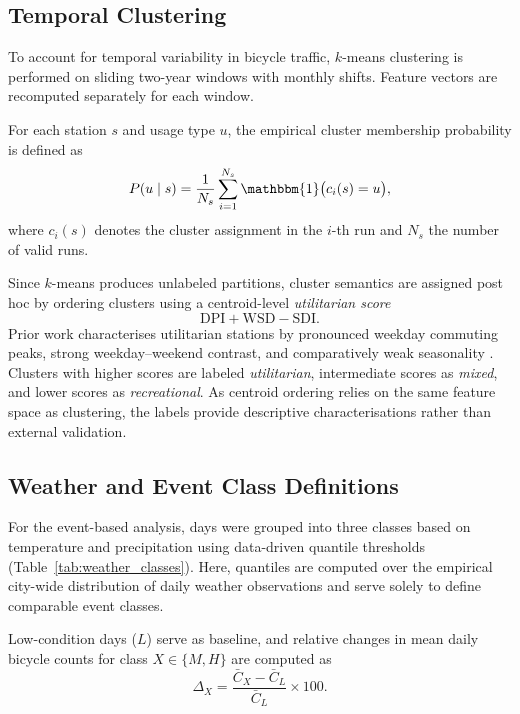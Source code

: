 \documentclass{article}
\begin{document}
\subsection*{Temporal Clustering}\label{sec:temporal_clustering}
To account for temporal variability in bicycle traffic, $k$-means clustering is performed on sliding two-year windows with monthly shifts. Feature vectors are recomputed separately for each window.

For each station $s$ and usage type $u$, the empirical cluster membership probability is defined as
\[
P(u \mid s) = \frac{1}{N_s} \sum_{i=1}^{N_s} \mathbbm{1}\bigl( c_i(s) = u \bigr),
\]
where $c_i(s)$ denotes the cluster assignment in the $i$-th run and $N_s$ the number of valid runs.



Since $k$-means produces unlabeled partitions, cluster semantics are assigned post hoc by ordering clusters using a centroid-level \emph{utilitarian score}
\[
\text{DPI} + \text{WSD} - \text{SDI}.
\]
Prior work characterises utilitarian stations by pronounced weekday commuting peaks, strong weekday–weekend contrast, and comparatively weak seasonality \cite{american_bike_patterns}.
Clusters with higher scores are labeled
\emph{utilitarian}, intermediate scores as \emph{mixed}, and lower scores as \emph{recreational}.
As centroid ordering relies on the same feature space as clustering, the labels provide descriptive characterisations rather than external validation.


\subsection*{Weather and Event Class Definitions}
For the event-based analysis, days were grouped into three classes based on temperature and precipitation using data-driven quantile thresholds (Table~\ref{tab:weather_classes}).
Here, quantiles are computed over the empirical city-wide distribution of daily weather observations and serve solely to define comparable event classes.

Low-condition days ($L$) serve as baseline, and relative changes in mean daily bicycle counts for class $X \in \{M,H\}$ are computed as
\[
\Delta_X = \frac{\bar{C}_X - \bar{C}_L}{\bar{C}_L} \times 100.
\]
\end{document}
